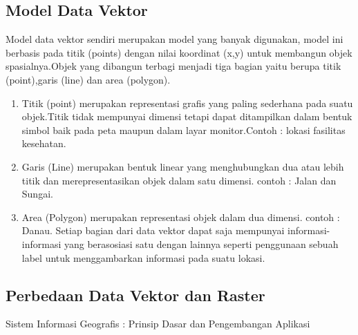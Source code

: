 \subsection {Model Data Vektor}
Model data vektor sendiri merupakan model yang banyak digunakan, model ini berbasis pada titik (points) dengan nilai koordinat (x,y) untuk membangun objek spasialnya.Objek yang dibangun terbagi menjadi tiga bagian yaitu berupa titik (point),garis (line) dan area (polygon).
\begin{enumerate}
\item Titik (point) merupakan representasi grafis yang paling sederhana pada suatu objek.Titik tidak mempunyai dimensi tetapi dapat     ditampilkan dalam bentuk simbol baik pada peta maupun dalam layar monitor.Contoh : lokasi fasilitas kesehatan.
\item Garis (Line) merupakan bentuk linear yang menghubungkan dua atau lebih titik dan merepresentasikan objek dalam satu dimensi. contoh : Jalan dan Sungai.
\item Area (Polygon) merupakan representasi objek dalam dua dimensi. contoh : Danau.
Setiap bagian dari data vektor dapat saja mempunyai informasi-informasi yang berasosiasi satu dengan lainnya seperti penggunaan sebuah label untuk menggambarkan informasi pada suatu lokasi.
\end{enumerate} 

\subsection {Perbedaan Data Vektor dan Raster}
Sistem Informasi Geografis : Prinsip Dasar dan Pengembangan Aplikasi


